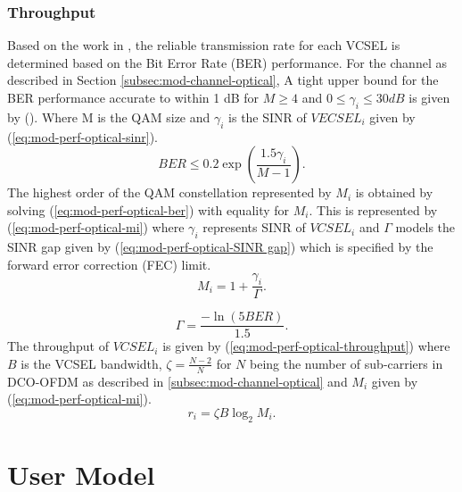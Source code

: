\subsubsection{Throughput}
Based on the work in \cite{sarbazi_tbs_2020}, the reliable transmission rate for each VCSEL is determined based on the Bit Error Rate (BER) performance. For the channel as described in Section \ref{subsec:mod-channel-optical}, A tight upper bound for the BER performance accurate to within 1 dB for $M\geq 4$ and $0 \leq \gamma_i \leq 30dB$ is given by ()\cite{goldsmith_variable-rate_1997}. Where M is the QAM size and $\gamma_i$ is the SINR of ${VECSEL}_i$ given by (\ref{eq:mod-perf-optical-sinr}).
\begin{equation}
    {BER} \leq 0.2\exp \left( \frac{1.5\gamma_i}{M - 1}\right).
    \label{eq:mod-perf-optical-ber}
\end{equation}
The highest order of the QAM constellation represented by $M_i$ is obtained by solving (\ref{eq:mod-perf-optical-ber}) with equality for $M_i$. This is represented by (\ref{eq:mod-perf-optical-mi}) where $\gamma_i$ represents SINR of ${VCSEL_i}$ and $\Gamma$ models the SINR gap given by (\ref{eq:mod-perf-optical-SINR gap}) which is specified by the forward error correction (FEC) limit\cite{sarbazi_tbs_2020}.
\begin{equation}
    M_i = 1 + \frac{\gamma_i}{\Gamma}.
    \label{eq:mod-perf-optical-mi}
\end{equation}

\begin{equation}
    \Gamma = \frac{-\ln{(5{BER})}}{1.5}.
    \label{eq:mod-perf-optical-SINR gap}
\end{equation}
The throughput of ${VCSEL_i}$ is given by (\ref{eq:mod-perf-optical-throughput}) where $B$ is the VCSEL bandwidth, $\zeta = \frac{N-2}{N}$ for $N$ being the number of sub-carriers in DCO-OFDM as described in \ref{subsec:mod-channel-optical} and $M_i$ given by (\ref{eq:mod-perf-optical-mi}).
\begin{equation}
    r_i = \zeta B \log_2M_i.
    \label{eq:mod-perf-optical-throughput}
\end{equation}
\section{User Model}
\label{sec:mod-usr}
